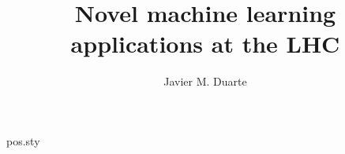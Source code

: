 \begin{filecontents*}{pos.sty}
\def\@dedicated{\@empty}
\def\@afterAbstractEmitNotes{\@empty}
\newcommand{\notes}[1]{\gdef\@afterAbstractEmitNotes{#1}}
\newcommand\dedicated[1]{\gdef\@dedicated{\vbox{\small\it\raggedleft #1}}}
\renewcommand{\abstract}[1]{\gdef\@abstract{#1}}
\gdef\FullConference@box{\relax}
\newcommand\FullConference[1]{\gdef\FullConference@box{\vbox{\small\raggedright\it #1}}}
\newtoks\affil@toks\newif\ifaffil\affilfalse
\newcommand{\affiliation}[2][]{\affiltrue
  \if!#1!\affil@toks=\expandafter{\the\affil@toks{\item[]#2}}%
  \else\affil@toks=\expandafter{\the\affil@toks{\item[$^{#1}$]#2}}\fi}
\newtoks\email@toks{}%
\newcommand{\emailAdd}[1]{\emailaddtrue%
  \ifnum\theemail@counter>0\email@toks=\expandafter{\the\email@toks, \@email{#1}}%
  \else\email@toks=\expandafter{\the\email@toks\@email{#1}}\fi\stepcounter{email@counter}}
\newcommand{\@email}[1]{\href{mailto:#1}{#1}}
\renewcommand\maketitle{\begingroup
  \begin{flushleft}
    {\LARGE\bfseries \@title\par}\medskip
    {\bfseries \printAuthors\par}
    \ifaffil\begin{list}{}{}\itshape\small\the\affil@toks\end{list}\fi
    \ifemailadd\textit{E-mail:} {\ttfamily\small\the\email@toks}\par\fi
    \if!\@abstract!\else\parbox{.9\textwidth}{\small\@abstract}\par\fi
    \@afterAbstractEmitNotes\par
    \@dedicated
    \FullConference@box
  \end{flushleft}
  \endgroup\setcounter{footnote}{0}}
\end{filecontents*}
\documentclass[a4paper,11pt]{article}
\usepackage{pos}
\title{Novel machine learning applications at the LHC}
\author*{Javier M. Duarte}

\maketitle
\section{Introduction}
Body.

